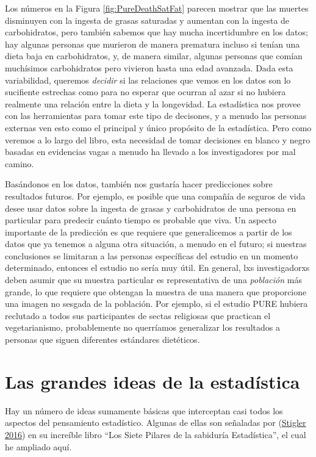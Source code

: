 \documentclass[
  12pt,
]{book}
\begin{document}
Los números en la Figura \ref{fig:PureDeathSatFat} parecen mostrar que las muertes disminuyen con la ingesta de grasas saturadas y aumentan con la ingesta de carbohidratos, pero también sabemos que hay mucha incertidumbre en los datos; hay algunas personas que murieron de manera prematura incluso si tenían una dieta baja en carbohidratos, y, de manera similar, algunas personas que comían muchísimos carbohidratos pero vivieron hasta una edad avanzada. Dada esta variabilidad, queremos \emph{decidir} si las relaciones que vemos en los datos son lo sucifiente estrechas como para no esperar que ocurran al azar si no hubiera realmente una relación entre la dieta y la longevidad. La estadística nos provee con las herramientas para tomar este tipo de decisones, y a menudo las personas externas ven esto como el principal y único propósito de la estadística. Pero como veremos a lo largo del libro, esta necesidad de tomar decisiones en blanco y negro basadas en evidencias vagas a menudo ha llevado a los investigadores por mal camino.

Basándonos en los datos, también nos gustaría hacer predicciones sobre resultados futuros. Por ejemplo, es posible que una compañía de seguros de vida desee usar datos sobre la ingesta de grasas y carbohidratos de una persona en particular para predecir cuánto tiempo es probable que viva. Un aspecto importante de la predicción es que requiere que generalicemos a partir de los datos que ya tenemos a alguna otra situación, a menudo en el futuro; si nuestras conclusiones se limitaran a las personas específicas del estudio en un momento determinado, entonces el estudio no sería muy útil. En general, lxs investigadorxs deben asumir que su muestra particular es representativa de una \emph{población} más grande, lo que requiere que obtengan la muestra de una manera que proporcione una imagen no sesgada de la población. Por ejemplo, si el estudio PURE hubiera reclutado a todos sus participantes de sectas religiosas que practican el vegetarianismo, probablemente no querríamos generalizar los resultados a personas que siguen diferentes estándares dietéticos.

\hypertarget{las-grandes-ideas-de-la-estaduxedstica}{%
\section{Las grandes ideas de la estadística}\label{las-grandes-ideas-de-la-estaduxedstica}}

Hay un número de ideas sumamente básicas que interceptan casi todos los aspectos del pensamiento estadístico. Algunas de ellas son señaladas por (\protect\hyperlink{ref-stig}{Stigler 2016}) en su increíble libro ``Los Siete Pilares de la sabiduría Estadística'', el cual he ampliado aquí.
\end{document}
